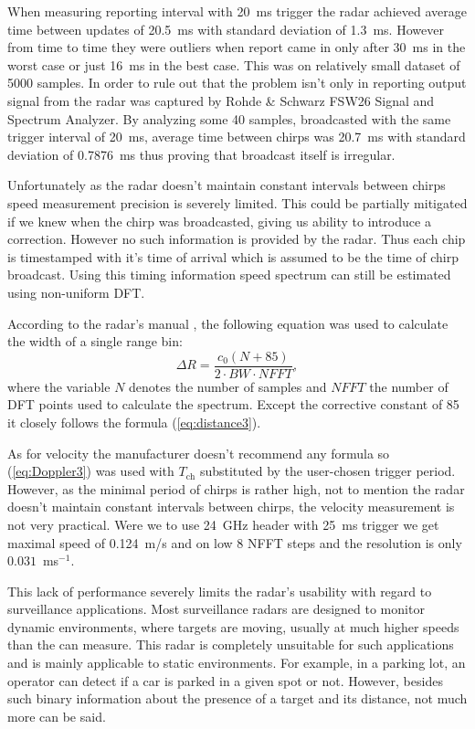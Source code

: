 When measuring reporting interval with 20~ms trigger the radar achieved average time between updates of 20.5~ms with standard deviation of 1.3~ms.
However from time to time they were outliers when report came in only after 30~ms in the worst case or just 16~ms in the best case.
This was on relatively small dataset of 5000 samples.
In order to rule out that the problem isn't only in reporting output signal from the radar was captured by Rohde \& Schwarz FSW26 Signal and Spectrum Analyzer.
By analyzing some 40 samples, broadcasted with the same trigger interval of 20~ms, average time between chirps was 20.7~ms with standard deviation of 0.7876~ms thus proving that broadcast itself is irregular.

Unfortunately as the radar doesn't maintain constant intervals between chirps speed measurement precision is severely limited.
This could be partially mitigated if we knew when the chirp was broadcasted, giving us ability to introduce a correction.
However no such information is provided by the radar.
Thus each chip is timestamped with it's time of arrival which is assumed to be the time of chirp broadcast.
Using this timing information speed spectrum can still be estimated using non-uniform DFT.

According to the radar's manual \cite{siradPRO}, the following equation was used to calculate the width of a single range bin:
\begin{equation}
  \Delta R = \frac{c_0 (N+85)}{2\cdot BW\cdot NFFT},
  \label{eq:rangeBin}
\end{equation}
where the variable $N$ denotes the number of samples and $NFFT$ the number of DFT points used to calculate the spectrum.
Except the corrective constant of 85 it closely follows the formula (\ref{eq:distance3}).

As for velocity the manufacturer doesn't recommend any formula so (\ref{eq:Doppler3}) was used with $T_\mathrm{ch}$ substituted by the user-chosen trigger period.
However, as the minimal period of chirps is rather high, not to mention the radar doesn't maintain constant intervals between chirps, the velocity measurement is not very practical.
Were we to use 24~GHz header with 25~ms trigger we get maximal speed of 0.124~m/s and on low 8 NFFT steps and the resolution is only $0.031$~ms$^{-1}$.

This lack of performance severely limits the radar's usability with regard to surveillance applications.
Most surveillance radars are designed to monitor dynamic environments, where targets are moving, usually at much higher speeds than the \sirad can measure.
This radar is completely unsuitable for such applications and is mainly applicable to static environments.
For example, in a parking lot, an operator can detect if a car is parked in a given spot or not.
However, besides such binary information about the presence of a target and its distance, not much more can be said.

